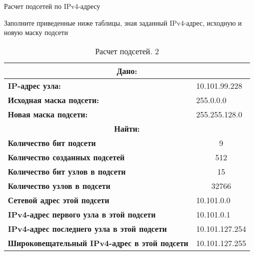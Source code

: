 \documentclass[a4paper,14pt]{extarticle}
\begin{document}
\begin{mypart}{Расчет подсетей по IPv4-адресу}
\begin{step}{Заполните приведенные ниже таблицы, зная заданный IPv4-адрес, исходную и
			новую маску подсети}
\begin{table}[h!]
		\centering
		\caption{Расчет подсетей. 2}
	\begin{tabular}{|l|l|}
		\hline
			\multicolumn{2}{|c|}{\textbf{Дано:}}  \\ \hline
		\textbf{IP-адрес узла:} & 10.101.99.228 \\ \hline
		\textbf{Исходная маска подсети:} & 255.0.0.0 \\ \hline
		\textbf{Новая маска подсети:} & 255.255.128.0 \\ \hline
			\multicolumn{2}{|c|}{\textbf{Найти:}}  \\ \hline
		\textbf{Количество бит подсети} & \multicolumn{1}{c|}{9} \\ \hline
		\textbf{Количество созданных подсетей} & \multicolumn{1}{c|}{512} \\ \hline
		\textbf{Количество бит узлов в подсети} & \multicolumn{1}{c|}{15} \\ \hline
		\textbf{Количество узлов в подсети} & \multicolumn{1}{c|}{32766} \\ \hline
		\textbf{Сетевой адрес этой подсети} & 10.101.0.0 \\ \hline
		\textbf{IPv4-адрес первого узла в этой подсети} & 10.101.0.1 \\ \hline
		\textbf{IPv4-адрес последнего узла в этой подсети} & 10.101.127.254 \\ \hline
		\textbf{Широковещательный IPv4-адрес в этой подсети} & 10.101.127.255 \\ \hline
	\end{tabular}
	\label{}
\end{table}


\end{step}
\end{mypart}
\end{document}
